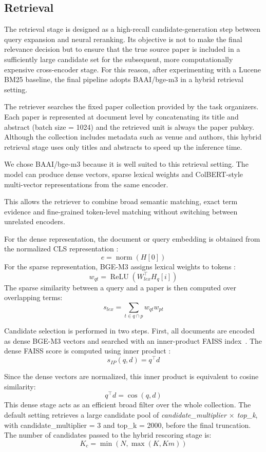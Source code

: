 \subsection{Retrieval} \label{sub:retrieval}
The retrieval stage is designed as a high-recall candidate-generation step between query expansion and neural reranking. Its objective is not to make the final relevance decision but to ensure that the true source paper is included in a sufficiently large candidate set for the subsequent, more computationally expensive cross-encoder stage. For this reason, after experimenting with a Lucene BM25 baseline, the final pipeline adopts BAAI/bge-m3 in a hybrid retrieval setting.

The retriever searches the fixed paper collection provided by the task organizers. Each paper is represented at document level by concatenating its title and abstract (batch size = 1024) and the retrieved unit is always the paper pubkey. Although the collection includes metadata such as venue and authors, this hybrid retrieval stage uses only titles and abstracts to speed up the inference time.

We chose BAAI/bge-m3 because it is well suited to this retrieval setting. The model can produce dense vectors, sparse lexical weights and ColBERT-style multi-vector representations from the same encoder.

This allows the retriever to combine broad semantic matching, exact term evidence and fine-grained token-level matching without switching between unrelated encoders.

For the dense representation, the document or query embedding is obtained from the normalized
CLS representation \cite{bge-m3}:
\[
    e=\operatorname{norm}(H[0])
\]
For the sparse representation, BGE-M3 assigns lexical weights to tokens \cite{bge_m3_docs}:
\[
    w_{qt}=\operatorname{ReLU}(W_{lex}^\top H_q[i])
\]
The sparse similarity between a query and a paper is then computed over overlapping terms:
\[
    s_{lex}=\sum_{t\in q\cap p} w_{qt}w_{pt}
\]

Candidate selection is performed in two steps. First, all documents are encoded as dense BGE-M3 vectors and searched with an inner-product FAISS index~\cite{faiss_documentation}.
The dense FAISS score is computed using inner product \cite{faiss_metrics}:
\[
    s_{IP}(q,d)=q^\top d
\]

Since the dense vectors are normalized, this inner product is equivalent to cosine similarity:
\[
    q^\top d=\cos(q,d)
\]
This dense stage acts as an efficient broad filter over the whole collection. The default setting retrieves a large candidate pool of \emph{candidate\_multiplier $\times$ top\_k}, with candidate\_multiplier = 3 and top\_k = 2000, before the final truncation.
The number of candidates passed to the hybrid rescoring stage is:
\[
    K_c=\min(N,\max(K,Km))
\]

